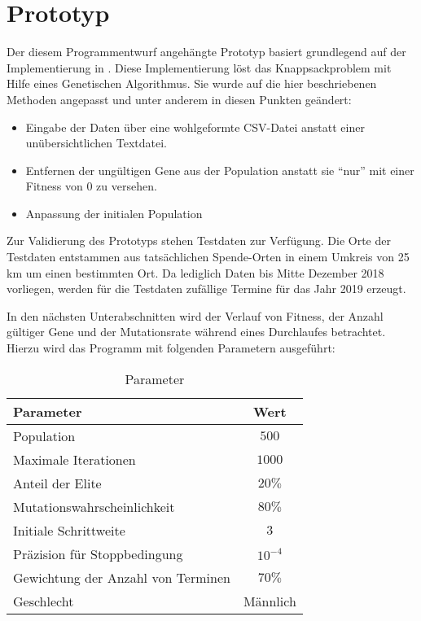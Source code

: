 \section{Prototyp}\label{sec:prototyp}

Der diesem Programmentwurf angehängte Prototyp basiert grundlegend auf der Implementierung in \cite{Quiz15Th91:online}.
Diese Implementierung löst das Knappsackproblem mit Hilfe eines Genetischen Algorithmus.
Sie wurde auf die hier beschriebenen Methoden angepasst und unter anderem
in diesen Punkten geändert:
\begin{itemize}
    \item Eingabe der Daten über eine wohlgeformte CSV-Datei anstatt einer unübersichtlichen Textdatei.
    \item Entfernen der ungültigen Gene aus der Population anstatt sie \enquote{nur} mit einer Fitness von $0$ zu versehen.
    \item Anpassung der initialen Population
\end{itemize}


\noindent
Zur Validierung des Prototyps stehen Testdaten zur Verfügung.
Die Orte der Testdaten entstammen aus tatsächlichen Spende-Orten in einem Umkreis von 25 km um einen bestimmten Ort.
Da lediglich Daten bis Mitte Dezember 2018 vorliegen,
werden für die Testdaten zufällige Termine für das Jahr 2019 erzeugt.

In den nächsten Unterabschnitten wird der Verlauf von Fitness, der Anzahl gültiger Gene und der Mutationsrate
während eines Durchlaufes betrachtet.
Hierzu wird das Programm mit folgenden Parametern ausgeführt:
\begin{table}[ht]%
    \begin{center}
        \begin{tabular}{l|c}
            Parameter                       & Wert \\
            \hline
            Population                      & $500$  \\
            Maximale Iterationen            & $1000$ \\
            Anteil der Elite                & $20\%$ \\
            Mutationswahrscheinlichkeit     & $80\%$ \\
            Initiale Schrittweite           & $3$     \\
            Präzision für Stoppbedingung    & $10^{-4}$\\
            Gewichtung der Anzahl von Terminen    & $70\%$\\
            Geschlecht                            & Männlich
        \end{tabular}
    \end{center}
    \caption{Parameter}
    \label{tab:parameter}
  \end{table}



